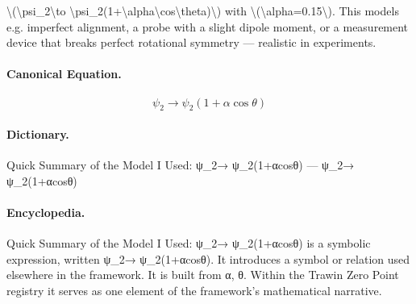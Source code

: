\textbackslash{}(\textbackslash{}psi\_2\textbackslash{}to \textbackslash{}psi\_2(1+\textbackslash{}alpha\textbackslash{}cos\textbackslash{}theta)\textbackslash{}) with \textbackslash{}(\textbackslash{}alpha=0.15\textbackslash{}). This models e.g. imperfect alignment, a probe with a slight dipole moment, or a measurement device that breaks perfect rotational symmetry — realistic in experiments.

\paragraph{Canonical Equation.}
\[
\psi_2\to \psi_2(1+\alpha\cos\theta)
\]

\paragraph{Dictionary.}
Quick Summary of the Model I Used: ψ\_2→ ψ\_2(1+αcosθ) — ψ\_2→ ψ\_2(1+αcosθ)

\paragraph{Encyclopedia.}
Quick Summary of the Model I Used: ψ\_2→ ψ\_2(1+αcosθ) is a symbolic expression, written ψ\_2→ ψ\_2(1+αcosθ). It introduces a symbol or relation used elsewhere in the framework. It is built from α, θ. Within the Trawin Zero Point registry it serves as one element of the framework's mathematical narrative.
